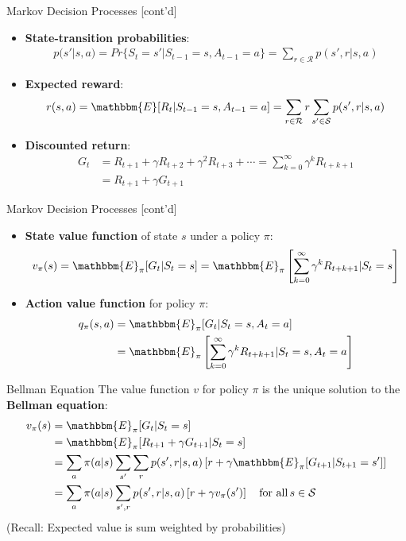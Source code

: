 \documentclass[ignorenonframetext,xcolor=x11names]{beamer}
\begin{document}
\begin{frame}[label=full]{Markov Decision Processes \small [cont'd]}
\begin{itemize}
   \item \textbf{State-transition probabilities}: 
\begin{align*}
p(s' | s, a) = Pr\{S_t = s' | S_{t-1} =s , A_{t-1} = a \} = \sum_{r \in \mathcal{R}} p(s', r|s, a)
\end{align*}
   \item \textbf{Expected reward}: 
\begin{align*}
r(s, a) = \mathbbm{E}[R_t | S_{t-1} =s , A_{t-1}=a] = \sum_{r \in \mathcal{R}} r \sum_{s' \in \mathcal{S}} p(s', r|s, a)
\end{align*}
   \item \textbf{Discounted return}:
\begin{align*}
G_t &= R_{t+1} + \gamma R_{t+2} + \gamma^2 R_{t+3} + \cdots = \sum_{k=0}^{\infty} \gamma^k R_{t+k+1} \\
    &= R_{t+1} + \gamma G_{t+1}
\end{align*}
\end{itemize}
\end{frame}

\begin{frame}[label=full]{Markov Decision Processes \small [cont'd]}
\begin{itemize}
  \item \textbf{State value function} of state $s$ under a policy $\pi$:
\begin{align*}
v_\pi(s) = \mathbbm{E}_\pi [ G_t | S_t = s] = \mathbbm{E}_\pi \left[ \sum_{k=0}^\infty \gamma^k R_{t + k + 1} | S_t = s \right]
\end{align*}
  \item \textbf{Action value function} for policy $\pi$:
\begin{align*}
q_\pi(s, a) &= \mathbbm{E}_\pi [ G_t | S_t = s, A_t = a] \\
&= \mathbbm{E}_\pi \left[ \sum_{k=0}^\infty \gamma^k R_{t + k + 1} | S_t = s, A_t = a \right]
\end{align*}
\end{itemize}
\end{frame}

\begin{frame}[label=full]{Bellman Equation}
The value function $v$ for policy $\pi$ is the unique solution to the \textbf{Bellman equation}:
\begin{align*}
v_\pi(s) &= \mathbbm{E}_\pi [ G_t | S_t = s] \\
&= \mathbbm{E}_\pi [R_{t+1} + \gamma G_{t+1} | S_t = s] \\
&= \sum_a \pi(a | s) \sum_{s'} \sum_r p(s', r | s, a) \left[ r + \gamma \mathbbm{E}_\pi [ G_{t+1} | S_{t+1} = s'] \right] \\
&= \sum_a \pi(a | s) \sum_{s', r} p(s', r | s, a) \left[r + \gamma v_\pi(s') \right] \quad \text{for all} \, s \in \mathcal{S}
\end{align*}
\centering
\footnotesize{(Recall: Expected value is sum weighted by probabilities)}
\end{frame}
\end{document}

